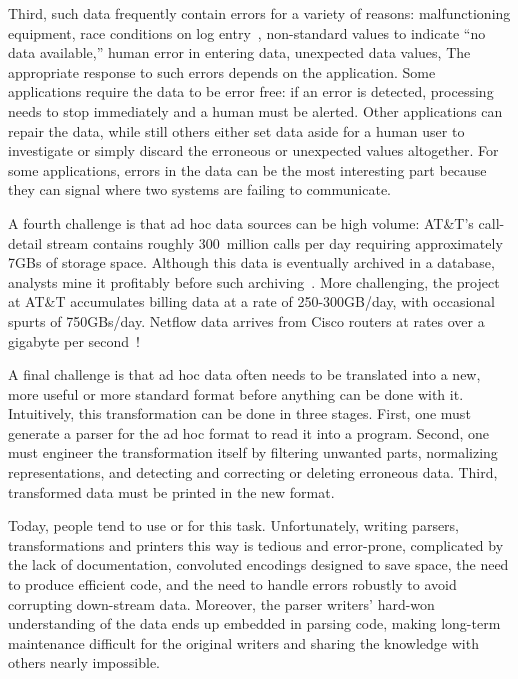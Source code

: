 \documentclass[11pt]{article}
\begin{document}
Third, such data frequently contain errors for a variety of reasons:
malfunctioning equipment, race conditions on log entry~\cite{wpp},
non-standard values to indicate ``no data available,'' human error in
entering data, unexpected data values, \etc{} The appropriate response
to such errors depends on the application.  Some applications require
the data to be error free: if an error is detected, processing needs
to stop immediately and a human must be alerted.  Other applications
can repair the data, while still others either set data aside for
a human user to investigate or simply discard the erroneous
or unexpected values altogether.  For some applications, errors in the data can
be the most interesting part because they can signal where two systems
are failing to communicate.

A fourth challenge is that ad hoc data sources can be high volume:
AT\&T's call-detail stream contains roughly 300~million calls per day
requiring approximately 7GBs of storage space. Although this data is
eventually archived in a database, analysts mine it profitably before
such archiving~\cite{kdd98,kdd99}. More challenging, the \ningaui{}
project at AT\&T accumulates billing data at a rate of 250-300GB/day,
with occasional spurts of 750GBs/day. Netflow data arrives from Cisco
routers at rates over a gigabyte per second~\cite{gigascope}! 

A final challenge is that ad hoc data often needs to be translated
into a new, more useful or more standard format before anything
can be done with it.  Intuitively, this transformation
can be done in three stages.  First, one must generate a parser for
the ad hoc format to read it into a program.  Second,
one must engineer the transformation itself by
filtering unwanted parts, normalizing representations, and
detecting and correcting or deleting erroneous data.  Third,
transformed data must be printed in the new format.

Today, people tend to use \C{} or \perl{} for this task.
Unfortunately, writing parsers, transformations and printers this way
is tedious and error-prone, complicated by the lack of documentation,
convoluted encodings designed to save space, the need to produce
efficient code, and the need to handle errors robustly to avoid
corrupting down-stream data.  Moreover, the parser writers' hard-won
understanding of the data ends up embedded in parsing code, making
long-term maintenance difficult for the original writers and sharing
the knowledge with others nearly impossible.
\end{document}
